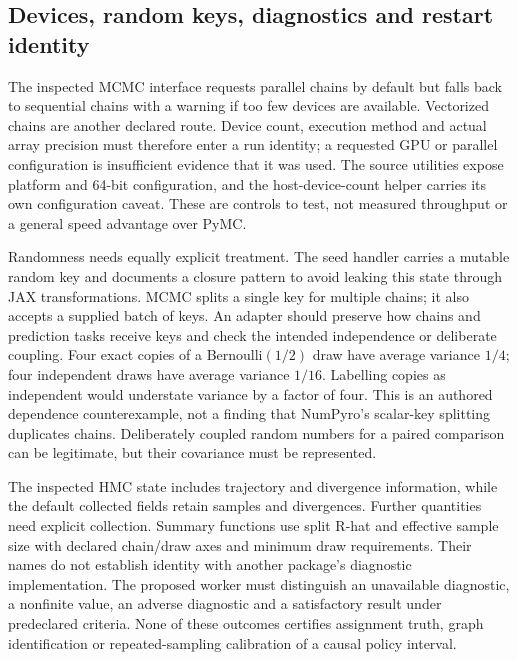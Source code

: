 \subsection{Devices, random keys, diagnostics and restart identity}

The inspected MCMC interface requests parallel chains by default but falls back to sequential chains with a warning if too few devices are available. Vectorized chains are another declared route. Device count, execution method and actual array precision must therefore enter a run identity; a requested GPU or parallel configuration is insufficient evidence that it was used. The source utilities expose platform and 64-bit configuration, and the host-device-count helper carries its own configuration caveat. These are controls to test, not measured throughput or a general speed advantage over PyMC. \citep{exec23_numpyro_sources}

Randomness needs equally explicit treatment. The seed handler carries a mutable random key and documents a closure pattern to avoid leaking this state through JAX transformations. MCMC splits a single key for multiple chains; it also accepts a supplied batch of keys. An adapter should preserve how chains and prediction tasks receive keys and check the intended independence or deliberate coupling. Four exact copies of a Bernoulli$(1/2)$ draw have average variance $1/4$; four independent draws have average variance $1/16$. Labelling copies as independent would understate variance by a factor of four. This is an authored dependence counterexample, not a finding that NumPyro's scalar-key splitting duplicates chains. Deliberately coupled random numbers for a paired comparison can be legitimate, but their covariance must be represented. \citep{exec23_numpyro_sources,exec23_numpyro_reference}

The inspected HMC state includes trajectory and divergence information, while the default collected fields retain samples and divergences. Further quantities need explicit collection. Summary functions use split R-hat and effective sample size with declared chain/draw axes and minimum draw requirements. Their names do not establish identity with another package's diagnostic implementation. The proposed worker must distinguish an unavailable diagnostic, a nonfinite value, an adverse diagnostic and a satisfactory result under predeclared criteria. None of these outcomes certifies assignment truth, graph identification or repeated-sampling calibration of a causal policy interval. \citep{exec23_numpyro_sources}

